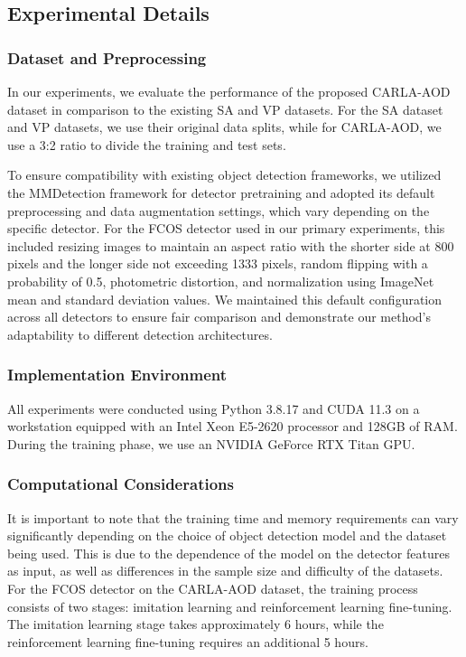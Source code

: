 \documentclass[lettersize,journal]{IEEEtran}
\begin{document}
\subsection{Experimental Details}
\subsubsection{Dataset and Preprocessing}
In our experiments, we evaluate the performance of the proposed CARLA-AOD dataset in comparison to the existing SA and VP datasets. For the SA dataset and VP datasets, we use their original data splits, while for CARLA-AOD, we use a 3:2 ratio to divide the training and test sets.

To ensure compatibility with existing object detection frameworks, we utilized the MMDetection \cite{mmdetection} framework for detector pretraining and adopted its default preprocessing and data augmentation settings, which vary depending on the specific detector. For the FCOS detector \cite{fcos2022b} used in our primary experiments, this included resizing images to maintain an aspect ratio with the shorter side at 800 pixels and the longer side not exceeding 1333 pixels, random flipping with a probability of 0.5, photometric distortion, and normalization using ImageNet mean and standard deviation values. We maintained this default configuration across all detectors to ensure fair comparison and demonstrate our method's adaptability to different detection architectures.

\subsubsection{Implementation Environment}
All experiments were conducted using Python 3.8.17 and CUDA 11.3 on a workstation equipped with an Intel Xeon E5-2620 processor and 128GB of RAM. During the training phase, we use an NVIDIA GeForce RTX Titan GPU. 

\subsubsection{Computational Considerations}
It is important to note that the training time and memory requirements can vary significantly depending on the choice of object detection model and the dataset being used. This is due to the dependence of the model on the detector features as input, as well as differences in the sample size and difficulty of the datasets. For the FCOS detector on the CARLA-AOD dataset, the training process consists of two stages: imitation learning and reinforcement learning fine-tuning. The imitation learning stage takes approximately 6 hours, while the reinforcement learning fine-tuning requires an additional 5 hours.   
\end{document}
